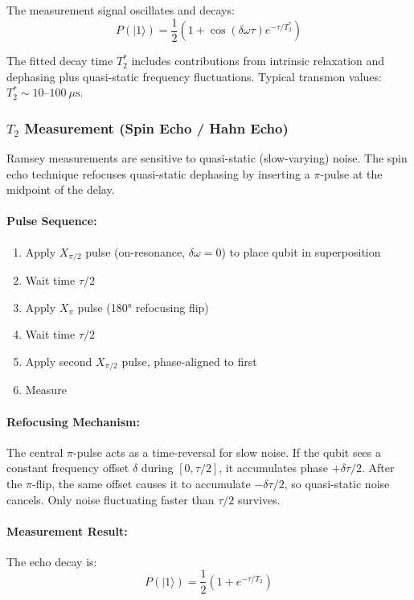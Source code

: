 \documentclass{article}
\begin{document}
The measurement signal oscillates and decays:
$$P(|1\rangle) = \frac{1}{2}\left(1 + \cos(\delta\omega \tau) e^{-\tau/T_2^*}\right)$$

The fitted decay time $T_2^*$ includes contributions from intrinsic relaxation and dephasing plus quasi-static frequency fluctuations. Typical transmon values: $T_2^* \sim 10$--$100~\mu\text{s}$.

\subsubsection*{$T_2$ Measurement (Spin Echo / Hahn Echo)}

Ramsey measurements are sensitive to quasi-static (slow-varying) noise. The spin echo technique refocuses quasi-static dephasing by inserting a $\pi$-pulse at the midpoint of the delay.

\paragraph{Pulse Sequence:}
\begin{enumerate}
    \item Apply $X_{\pi/2}$ pulse (on-resonance, $\delta\omega = 0$) to place qubit in superposition
    \item Wait time $\tau/2$
    \item Apply $X_\pi$ pulse (180° refocusing flip)
    \item Wait time $\tau/2$
    \item Apply second $X_{\pi/2}$ pulse, phase-aligned to first
    \item Measure
\end{enumerate}

\paragraph{Refocusing Mechanism:} The central $\pi$-pulse acts as a time-reversal for slow noise. If the qubit sees a constant frequency offset $\delta$ during $[0, \tau/2]$, it accumulates phase $+\delta\tau/2$. After the $\pi$-flip, the same offset causes it to accumulate $-\delta\tau/2$, so quasi-static noise cancels. Only noise fluctuating faster than $\tau/2$ survives.

\paragraph{Measurement Result:} The echo decay is:
$$P(|1\rangle) = \frac{1}{2}(1 + e^{-\tau/T_2})$$
\end{document}
